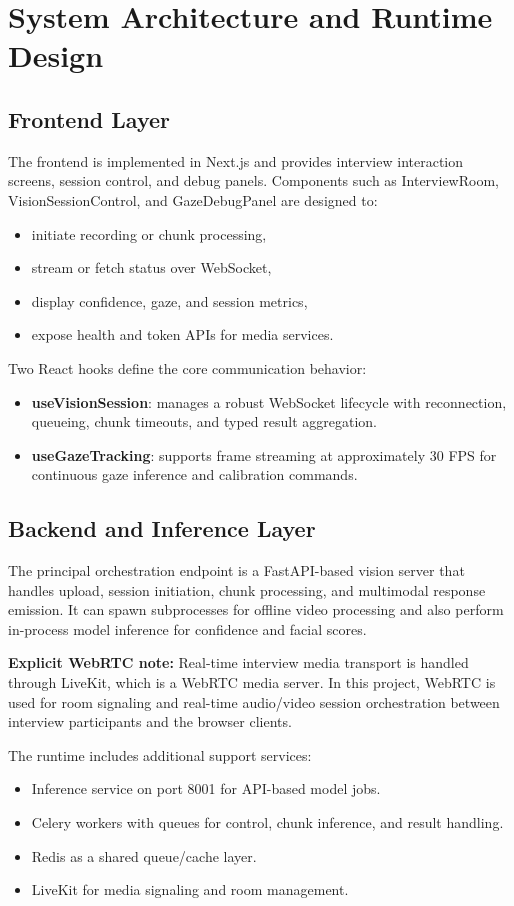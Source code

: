 \documentclass[12pt,a4paper]{report}
\begin{document}
\chapter{System Architecture and Runtime Design}
\section{Frontend Layer}
The frontend is implemented in Next.js and provides interview interaction screens, session control, and debug panels. Components such as InterviewRoom, VisionSessionControl, and GazeDebugPanel are designed to:
\begin{itemize}[leftmargin=1.5em]
\item initiate recording or chunk processing,
\item stream or fetch status over WebSocket,
\item display confidence, gaze, and session metrics,
\item expose health and token APIs for media services.
\end{itemize}

Two React hooks define the core communication behavior:
\begin{itemize}[leftmargin=1.5em]
\item \textbf{useVisionSession}: manages a robust WebSocket lifecycle with reconnection, queueing, chunk timeouts, and typed result aggregation.
\item \textbf{useGazeTracking}: supports frame streaming at approximately 30 FPS for continuous gaze inference and calibration commands.
\end{itemize}

\section{Backend and Inference Layer}
The principal orchestration endpoint is a FastAPI-based vision server that handles upload, session initiation, chunk processing, and multimodal response emission. It can spawn subprocesses for offline video processing and also perform in-process model inference for confidence and facial scores.

\textbf{Explicit WebRTC note:} Real-time interview media transport is handled through LiveKit, which is a WebRTC media server. In this project, WebRTC is used for room signaling and real-time audio/video session orchestration between interview participants and the browser clients.

The runtime includes additional support services:
\begin{itemize}[leftmargin=1.5em]
\item Inference service on port 8001 for API-based model jobs.
\item Celery workers with queues for control, chunk inference, and result handling.
\item Redis as a shared queue/cache layer.
\item LiveKit for media signaling and room management.
\end{itemize}
\end{document}
